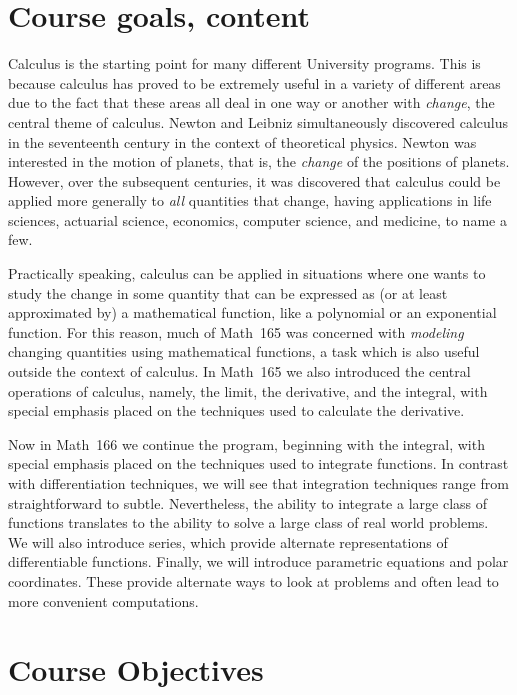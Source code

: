 \documentclass[11pt]{article}
\begin{document}
\section{Course goals, content}
Calculus is the starting point for
many different University programs.
This is because calculus has proved to be extremely useful
in a variety of different areas due to
the fact that these areas all
deal in one way or another with {\em change},
the central theme of calculus.
Newton and Leibniz simultaneously discovered calculus in the 
seventeenth century in the context of theoretical physics.
Newton was interested in the motion of planets,
that is, the {\em change} of the positions of planets.
However, over the subsequent centuries, it was discovered
that calculus could be applied more generally to
{\em all} quantities that change, having applications in life sciences,
actuarial science, economics, computer science, and medicine,
to name a few.

Practically speaking, calculus can be applied in situations
where one wants to study the change in some quantity
that can be expressed as (or at least approximated by)
a mathematical function, like a polynomial or an exponential function.
For this reason, much of Math~165 was concerned with
{\em modeling} changing quantities using mathematical functions,
a task which is also useful outside the context of calculus.
In Math~165 we also introduced the central
operations of calculus, namely, the limit, the derivative, and the integral,
with special emphasis placed on the techniques used to calculate
the derivative.

Now in Math~166 we continue the program, beginning with the
integral, with special emphasis placed on the techniques used to
integrate functions. In contrast with differentiation techniques,
we will see that integration techniques range from
straightforward to subtle. Nevertheless, the ability to integrate
a large class of functions translates to the ability to solve a large
class of real world problems. We will also introduce series, which
provide alternate representations of differentiable functions.
Finally, we will introduce parametric equations and polar
coordinates. These provide alternate ways to look at problems
and often lead to more convenient computations.

\section{Course Objectives}
\end{document}
